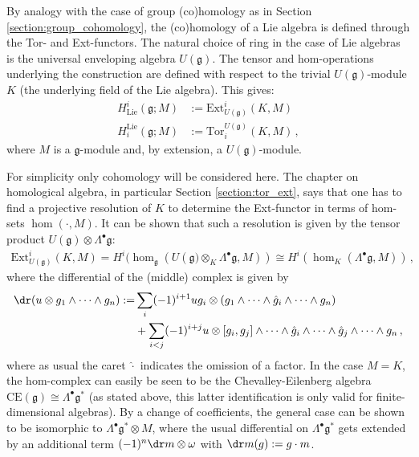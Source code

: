     By analogy with the case of group (co)homology as in Section \ref{section:group_cohomology}, the (co)homology of a Lie algebra is defined through the Tor- and Ext-functors. The natural choice of ring in the case of Lie algebras is the universal enveloping algebra $U(\mathfrak{g})$. The tensor and hom-operations underlying the construction are defined with respect to the trivial $U(\mathfrak{g})$-module $K$ (the underlying field of the Lie algebra). This gives:
    \begin{align}
        H^i_\mathrm{Lie}(\mathfrak{g};M) &:= \mathrm{Ext}^i_{U(\mathfrak{g})}(K,M)\\
        H_i^\mathrm{Lie}(\mathfrak{g};M) &:= \mathrm{Tor}_i^{U(\mathfrak{g})}(K,M)\,,
    \end{align}
    where $M$ is a $\mathfrak{g}$-module and, by extension, a $U(\mathfrak{g})$-module.

    For simplicity only cohomology will be considered here. The chapter on homological algebra, in particular Section \ref{section:tor_ext}, says that one has to find a projective resolution of $K$ to determine the Ext-functor in terms of hom-sets $\hom(\cdot, M)$. It can be shown that such a resolution is given by the tensor product $U(\mathfrak{g})\otimes\Lambda^\bullet\mathfrak{g}$:
    \begin{gather}
        \mathrm{Ext}^i_{U(\mathfrak{g})}(K,M) = H^i(\hom_\mathfrak{g}(U(\mathfrak{g)}\otimes_K\Lambda^\bullet\mathfrak{g},M))\cong H^i(\hom_K(\Lambda^\bullet\mathfrak{g},M))\,,
    \end{gather}
    where the differential of the (middle) complex is given by
    \begin{align}
        \dr(u\otimes g_1\wedge\cdots\wedge g_n) := &\sum_i(-1)^{i+1}ug_i\otimes(g_1\wedge\cdots\wedge\hat{g}_i\wedge\cdots\wedge g_n)\\
        &+\sum_{i<j}(-1)^{i+j}u\otimes[g_i,g_j]\wedge\cdots\wedge\hat{g}_i\wedge\cdots\wedge\hat{g}_j\wedge\cdots\wedge g_n\,,\nonumber
    \end{align}
    where as usual the caret $\hat\cdot$ indicates the omission of a factor. In the case $M=K$, the hom-complex can easily be seen to be the Chevalley-Eilenberg algebra $\mathrm{CE}(\mathfrak{g})\cong\Lambda^\bullet\mathfrak{g}^*$ (as stated above, this latter identification is only valid for finite-dimensional algebras). By a change of coefficients, the general case can be shown to be isomorphic to $\Lambda^\bullet\mathfrak{g}^*\otimes M$, where the usual differential on $\Lambda^\bullet\mathfrak{g}^*$ gets extended by an additional term $(-1)^n\dr m\otimes\omega$ with $\dr m(g):=g\cdot m$.

